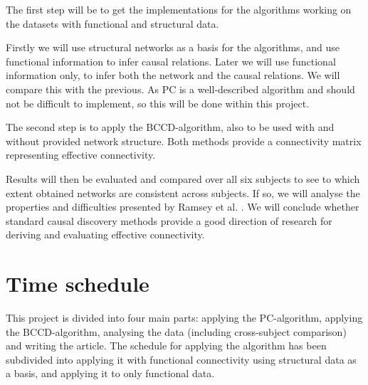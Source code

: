 \documentclass[a4paper, 10pt, english, twocolumn]{article}
\begin{document}
The first step will be to get the implementations for the algorithms working on the datasets with functional and structural data.

Firstly we will use structural networks as a basis for the algorithms, and use functional information to infer causal relations.
Later we will use functional information only, to infer both the network and the causal relations.
We will compare this with the previous.
As PC is a well-described algorithm \cite{spirtes2000} and should not be difficult to implement, so this will be done within this project.

The second step is to apply the BCCD-algorithm, also to be used with and without provided network structure.
Both methods provide a connectivity matrix representing effective connectivity.

Results will then be evaluated and compared over all six subjects to see to which extent obtained networks are consistent across subjects.
If so, we will analyse the properties and difficulties presented by Ramsey et al. \cite{ramsey2010}.
We will conclude whether standard causal discovery methods provide a good direction of research for deriving and evaluating effective connectivity.


\section{Time schedule}
This project is divided into four main parts: applying the PC-algorithm, applying the BCCD-algorithm, analysing the data (including cross-subject comparison) and writing the article. The schedule for applying the algorithm has been subdivided into applying it with functional connectivity using structural data as a basis, and applying it to only functional data.



{}

\end{document}
